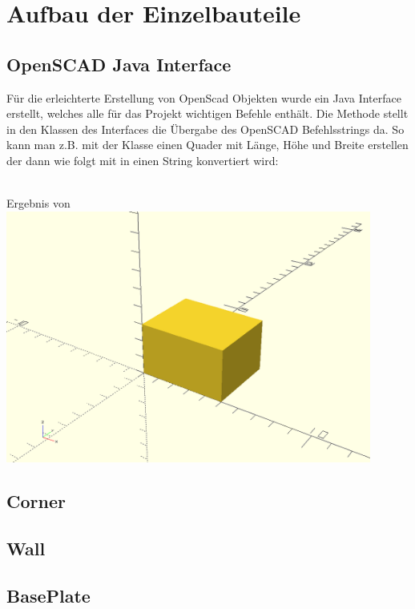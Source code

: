\section{Aufbau der Einzelbauteile}

\subsection{OpenSCAD Java Interface}
Für die erleichterte Erstellung von OpenScad Objekten wurde ein Java Interface  erstellt, welches alle für das Projekt wichtigen Befehle enthält.
Die Methode  stellt in den Klassen des Interfaces die Übergabe des OpenSCAD Befehlsstrings da.
So kann man z.B. mit der Klasse  einen Quader mit Länge, Höhe und Breite erstellen der dann wie folgt mit  in einen String konvertiert wird:\\
\\
\begin{Bild}{Ergebnis von }
	\includegraphics[width = 120mm]{Bilder/Quader}
\end{Bild}



\subsection{Corner}
\subsection{Wall}
\subsection{BasePlate}